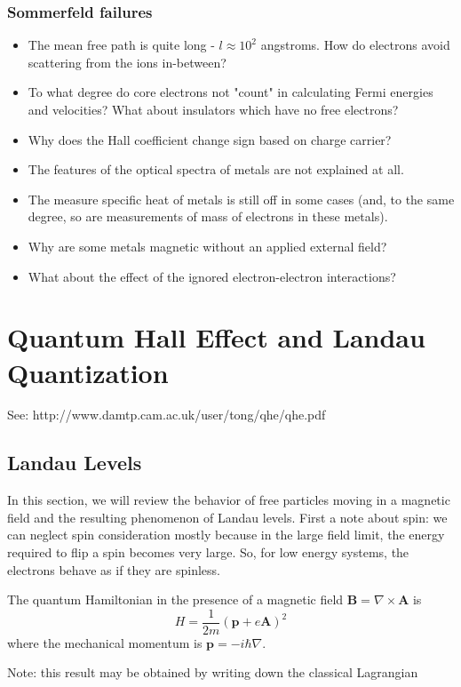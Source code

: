 \documentclass[10pt]{article}
\begin{document}
\subsubsection{Sommerfeld failures}
\begin{itemize}
  \item The mean free path is quite long - $l \approx 10^{2}$ angstroms. How do electrons avoid scattering from the ions in-between?
  \item To what degree do core electrons not "count" in calculating Fermi energies and velocities? What about insulators which have no free
  electrons?
  \item Why does the Hall coefficient change sign based on charge carrier?
  \item The features of the optical spectra of metals are not explained at all.
  \item The measure specific heat of metals is still off in some cases (and, to the same degree, so are measurements of
  mass of electrons in these metals).
  \item Why are some metals magnetic without an applied external field?
  \item What about the effect of the ignored electron-electron interactions?
\end{itemize}

\section{Quantum Hall Effect and Landau Quantization}
See: http://www.damtp.cam.ac.uk/user/tong/qhe/qhe.pdf
\subsection{Landau Levels}
In this section, we will review the behavior of free particles moving in a magnetic field and the resulting phenomenon of
Landau levels. First a note about spin: we can neglect spin consideration mostly because in the large field limit, the energy required to flip a
spin becomes very large. So, for low energy systems, the electrons behave as if they are spinless.

The quantum Hamiltonian in the presence of a magnetic field $\textbf{B} = \nabla \times \textbf{A}$ is
$$
H = \frac{1}{2m}(\textbf{p} + e\textbf{A})^{2}
$$
where the mechanical momentum is $\textbf{p} = -i\hbar\nabla$.

Note: this result may be obtained by writing down the classical Lagrangian
\end{document}
